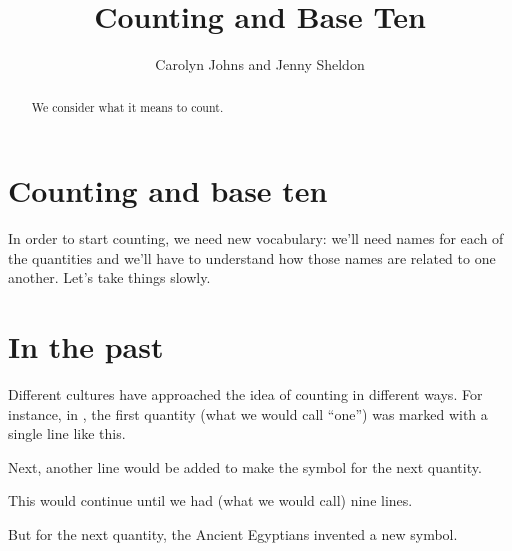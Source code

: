\documentclass{ximera}
\title{Counting and Base Ten}
\author{Carolyn Johns and Jenny Sheldon}
\begin{document}
\begin{abstract}
We consider what it means to count.
\end{abstract}
\maketitle



\section{Counting and base ten}

In order to start counting, we need new vocabulary: we'll need names for each of the quantities and we'll have to understand how those names are related to one another. Let's take things slowly.

\section{In the past} 

Different cultures have approached the idea of counting in different ways. For instance, in , the first quantity (what we would call ``one'') was marked with a single line like this.


\begin{image}
\end{image}



Next, another line would be added to make the symbol for the next quantity.


\begin{image}
\end{image}


This would continue until we had (what we would call) nine lines.

\begin{image}
\end{image}


But for the next quantity, the Ancient Egyptians invented a new symbol.
\end{document}
